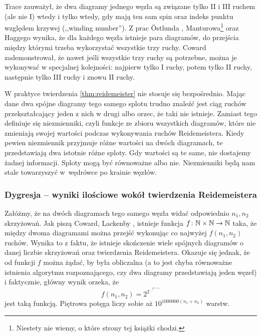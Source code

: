 Trace \cite{trace1983} zauważył, że dwa diagramy jednego węzła są związane tylko II i III ruchem (ale nie I) wtedy i tylko wtedy, gdy mają ten sam spin oraz indeks punktu względem krzywej (,,winding number'').
%
Z prac Östlunda \cite{ostlund2001}, Manturowa\footnote{Niestety nie wiemy, o które strony tej książki chodzi.} \cite{manturov2004} oraz Haggego \cite{hagge2006} wynika, że dla każdego węzła istnieje para diagramów, do przejścia między którymi trzeba wykorzystać wszystkie trzy ruchy.
%
%
%
Coward \cite{coward2006} zademonstrował, że nawet jeśli wszystkie trzy ruchy są potrzebne, można je wykonywać w specjalnej kolejności: najpierw tylko I ruchy, potem tylko II ruchy, następnie tylko III ruchy i znowu II ruchy.
%

W praktyce twierdzenia \ref{thm:reidemeister} nie stosuje się bezpośrednio.
Mając dane dwa spójne diagramy tego samego splotu trudno znaleźć jest ciąg ruchów przekształcający jeden z nich w drugi albo orzec, że taki nie istnieje.
Zamiast tego definiuje się niezmienniki, czyli funkcje ze zbioru wszystkich diagramów, które nie zmieniają swojej wartości podczas wykonywania ruchów Reidemeistera.
Kiedy pewien niezmiennik przyjmuje różne wartości na dwóch diagramach, te przedstawiają dwa istotnie różne sploty.
Gdy wartości są te same, nie dostajemy żadnej informacji.
Sploty mogą być równoważne albo nie.
Niezmienniki będą nam stale towarzyszyć w~wędrówce po krainie węzłów.

\subsubsection{Dygresja -- wyniki ilościowe wokół twierdzenia Reidemeistera}
Załóżmy, że na dwóch diagramach tego samego węzła widać odpowiednio $n_1, n_2$ skrzyżowań.
Jak piszą Coward, Lackenby \cite{coward2011}, istnieje funkcja $f \colon \mathbb N \times \mathbb N \to \mathbb N$ taka, że między dwoma diagramami można przejść wykonując co najwyżej $f(n_1, n_2)$ ruchów.
%
%
Wynika to z faktu, że istnieje skończenie wiele spójnych diagramów o danej liczbie skrzyżowań oraz twierdzenia Reidemeistera.
Okazuje się jednak, że od funkcji $f$ można żądać, by była obliczalna
(a to jest chyba równoważne istnienia algorytmu rozpoznającego, czy dwa diagramy przedstawiają jeden węzeł)
i faktycznie, główny wynik \cite{coward2011} orzeka, że
\begin{equation}
    f(n_1, n_2) = 2^{2^{\ldots^{2^{n_1 + n_2}}}}
\end{equation}
jest taką funkcją.
Piętrowa potęga liczy sobie aż $10^{1000000 (n_1 + n_2)}$ warstw.

